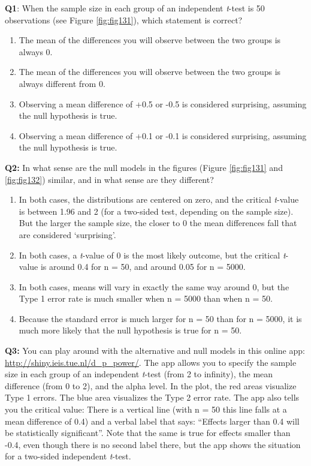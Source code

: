 \documentclass[
  oneside]{krantz}
\providecommand{\tightlist}{%
  \setlength{\itemsep}{0pt}\setlength{\parskip}{0pt}}
\begin{document}
\textbf{Q1}: When the sample size in each group of an independent \emph{t}-test is 50
observations (see Figure \ref{fig:fig131}), which statement is correct?

\begin{enumerate}
\def\labelenumi{\Alph{enumi})}
\tightlist
\item
  The mean of the differences you will observe between the two groups is always 0.
\item
  The mean of the differences you will observe between the two groups is always different from 0.
\item
  Observing a mean difference of +0.5 or -0.5 is considered surprising, assuming the null hypothesis is true.
\item
  Observing a mean difference of +0.1 or -0.1 is considered surprising, assuming the null hypothesis is true.
\end{enumerate}

\textbf{Q2:} In what sense are the null models in the figures (Figure \ref{fig:fig131} and \ref{fig:fig132}) similar, and in what sense are they different?

\begin{enumerate}
\def\labelenumi{\Alph{enumi})}
\tightlist
\item
  In both cases, the distributions are centered on zero, and the critical
  \emph{t}-value is between 1.96 and 2 (for a two-sided test, depending on the sample size). But the larger the sample size, the closer to 0 the mean differences fall that are considered `surprising'.
\item
  In both cases, a \emph{t}-value of 0 is the most likely outcome, but the critical \emph{t}-value is around 0.4 for n = 50, and around 0.05 for n = 5000.
\item
  In both cases, means will vary in exactly the same way around 0, but the Type 1 error rate is much smaller when n = 5000 than when n = 50.
\item
  Because the standard error is much larger for n = 50 than for n = 5000, it is much more likely that the null hypothesis is true for n = 50.
\end{enumerate}

\textbf{Q3:} You can play around with the alternative and null models in this online app: \url{http://shiny.ieis.tue.nl/d_p_power/}. The app allows you to specify the sample size in each group of an independent \emph{t}-test (from 2 to infinity), the mean difference (from 0 to 2), and the alpha level. In the plot, the red areas visualize Type 1 errors. The blue area visualizes the Type 2 error rate. The app also tells you the critical value: There is a vertical line (with n = 50 this line falls at a mean difference of 0.4) and a verbal label that says: ``Effects larger than 0.4 will be statistically significant''. Note that the same is true for effects smaller than -0.4, even though there is no second label there, but the app shows the situation for a two-sided independent \emph{t}-test.
\end{document}
